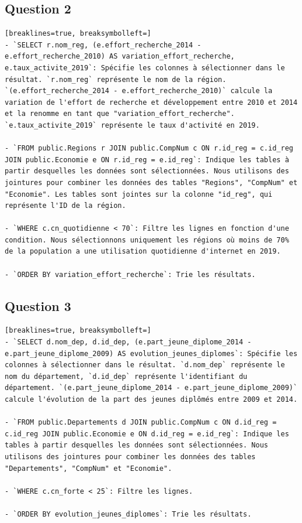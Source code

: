 \documentclass[a4paper, 11pt]{article}
\begin{document}
\subsection{Question 2}
\begin{Verbatim}[breaklines=true, breaksymbolleft=]
- `SELECT r.nom_reg, (e.effort_recherche_2014 - e.effort_recherche_2010) AS variation_effort_recherche, e.taux_activite_2019`: Spécifie les colonnes à sélectionner dans le résultat. `r.nom_reg` représente le nom de la région. `(e.effort_recherche_2014 - e.effort_recherche_2010)` calcule la variation de l'effort de recherche et développement entre 2010 et 2014 et la renomme en tant que "variation_effort_recherche". `e.taux_activite_2019` représente le taux d'activité en 2019.

- `FROM public.Regions r JOIN public.CompNum c ON r.id_reg = c.id_reg JOIN public.Economie e ON r.id_reg = e.id_reg`: Indique les tables à partir desquelles les données sont sélectionnées. Nous utilisons des jointures pour combiner les données des tables "Regions", "CompNum" et "Economie". Les tables sont jointes sur la colonne "id_reg", qui représente l'ID de la région.

- `WHERE c.cn_quotidienne < 70`: Filtre les lignes en fonction d'une condition. Nous sélectionnons uniquement les régions où moins de 70% de la population a une utilisation quotidienne d'internet en 2019.

- `ORDER BY variation_effort_recherche`: Trie les résultats.
\end{Verbatim}
\subsection{Question 3}
\begin{Verbatim}[breaklines=true, breaksymbolleft=]
- `SELECT d.nom_dep, d.id_dep, (e.part_jeune_diplome_2014 - e.part_jeune_diplome_2009) AS evolution_jeunes_diplomes`: Spécifie les colonnes à sélectionner dans le résultat. `d.nom_dep` représente le nom du département, `d.id_dep` représente l'identifiant du département. `(e.part_jeune_diplome_2014 - e.part_jeune_diplome_2009)` calcule l'évolution de la part des jeunes diplômés entre 2009 et 2014.

- `FROM public.Departements d JOIN public.CompNum c ON d.id_reg = c.id_reg JOIN public.Economie e ON d.id_reg = e.id_reg`: Indique les tables à partir desquelles les données sont sélectionnées. Nous utilisons des jointures pour combiner les données des tables "Departements", "CompNum" et "Economie".

- `WHERE c.cn_forte < 25`: Filtre les lignes. 

- `ORDER BY evolution_jeunes_diplomes`: Trie les résultats.
\end{Verbatim}
\end{document}
